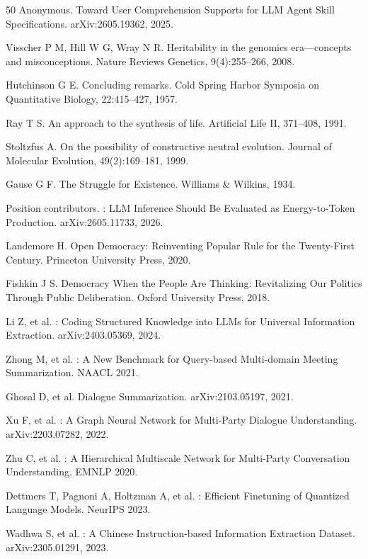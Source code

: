 \documentclass[twocolumn,10.5pt]{ctexart}
\begin{document}
\begin{thebibliography}{50}
Anonymous.
\newblock Toward User Comprehension Supports for {LLM} Agent Skill Specifications.
\newblock arXiv:2605.19362, 2025.

Visscher P M, Hill W G, Wray N R.
\newblock Heritability in the genomics era---concepts and misconceptions.
\newblock Nature Reviews Genetics, 9(4):255--266, 2008.

Hutchinson G E.
\newblock Concluding remarks.
\newblock Cold Spring Harbor Symposia on Quantitative Biology, 22:415--427, 1957.

Ray T S.
\newblock An approach to the synthesis of life.
\newblock Artificial Life II, 371--408, 1991.

Stoltzfus A.
\newblock On the possibility of constructive neutral evolution.
\newblock Journal of Molecular Evolution, 49(2):169--181, 1999.

Gause G F.
\newblock The Struggle for Existence.
\newblock Williams \& Wilkins, 1934.

{Position} contributors.
: LLM Inference Should Be Evaluated as Energy-to-Token Production.
\newblock arXiv:2605.11733, 2026.

Landemore H.
\newblock Open Democracy: Reinventing Popular Rule for the Twenty-First Century.
\newblock Princeton University Press, 2020.

Fishkin J S.
\newblock Democracy When the People Are Thinking: Revitalizing Our Politics Through Public Deliberation.
\newblock Oxford University Press, 2018.

Li Z, et al.
: Coding Structured Knowledge into LLMs for Universal Information Extraction.
\newblock arXiv:2403.05369, 2024.

Zhong M, et al.
: A New Benchmark for Query-based Multi-domain Meeting Summarization.
\newblock NAACL 2021.

Ghosal D, et al.
\newblock Dialogue Summarization.
\newblock arXiv:2103.05197, 2021.

Xu F, et al.
: A Graph Neural Network for Multi-Party Dialogue Understanding.
\newblock arXiv:2203.07282, 2022.

Zhu C, et al.
: A Hierarchical Multiscale Network for Multi-Party Conversation Understanding.
\newblock EMNLP 2020.

Dettmers T, Pagnoni A, Holtzman A, et al.
: Efficient Finetuning of Quantized Language Models.
\newblock NeurIPS 2023.

Wadhwa S, et al.
: A Chinese Instruction-based Information Extraction Dataset.
\newblock arXiv:2305.01291, 2023.

\end{thebibliography}
\end{document}
